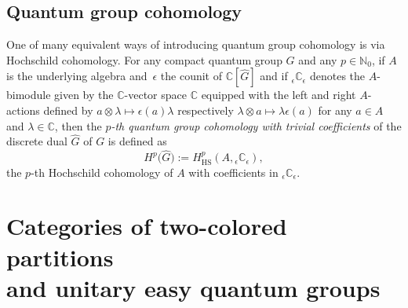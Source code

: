 \documentclass[10pt,a4paper]{amsart}
\numberwithin{equation}{section}
\newcommand{\HScohomology}[3]{H^{#1}_{\mathrm{HS}}(#2,#3)}
\newcommand{\Scounit}{\epsilon}
\newcommand{\Smonoidalproduct}{\otimes}
\newcommand{\nnint}{{\mathbb{N}_0}}
\newcommand{\comps}{\mathbb{C}}
\newcommand{\DQGgroupalgebra}[1]{\comps [#1 ]}
\newcommand{\DQGcohomologyTC}[2]{H^{#1} \bigl(#2 \bigr)}
\newcommand{\CQGdualC}[1]{\widehat{#1}}
\newcommand{\theqg}{G}
\newcommand{\thecounit}{\Scounit}
\begin{document}
\subsection{Quantum group cohomology}
\label{section:quantum-groups-cohomology}
{
  \newcommand{\thederivs}{\mathrm{Der}_\epsilon(A)}
  \newcommand{\anycoc}{\eta}
  \newcommand{\leftop}{a_1}
  \newcommand{\rightop}{a_2}
  \newcommand{\anygen}{e}
  \newcommand{\thetuple}{x}
  \newcommand{\thetuplex}[1]{\thetuple_{#1}}
  \newcommand{\genels}[1]{a_{#1}}
  \newcommand{\theorder}{p}
  \newcommand{\thealgebra}{A}
  \newcommand{\themod}{{}_\thecounit\comps_\thecounit}
  \newcommand{\somescal}{\lambda}
  \newcommand{\someop}{a}
One of many equivalent ways of introducing  quantum group cohomology is via Hochschild cohomology.
  For any compact quantum group $\theqg$ and any $\theorder\in\nnint$, if $\thealgebra$ is the underlying algebra and~$\thecounit$ the counit of  $\DQGgroupalgebra{\CQGdualC{\theqg}}$ and if $\themod$ denotes the $\thealgebra$-bimodule given by the $\comps$-vector space $\comps$ equipped with the left and right $\thealgebra$-actions defined by $\someop\Smonoidalproduct\somescal\mapsto \thecounit(\someop)\somescal$ respectively $\somescal\Smonoidalproduct\someop\mapsto \somescal\thecounit(\someop)$ for any $\someop\in\thealgebra$ and $\somescal\in\comps$,
  then the \emph{$\theorder$-th quantum group cohomology with trivial coefficients} of the discrete dual $\CQGdualC{\theqg}$ of $\theqg$ is defined as
  \[
    \DQGcohomologyTC{\theorder}{\CQGdualC{\theqg}}:=\HScohomology{\theorder}{\thealgebra}{\themod},
  \]
  the $\theorder$-th Hochschild cohomology of $\thealgebra$ with coefficients in $\themod$.
}

\section[Categories of two-colored partitions and unitary easy quantum groups]{Categories of two-colored partitions\\ and unitary easy quantum groups}
\label{section:easy}
\end{document}
